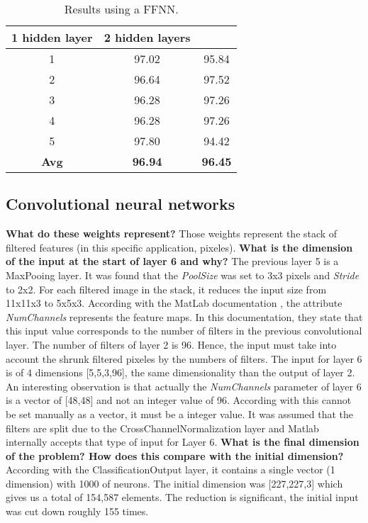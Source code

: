 \begin{table}[!htbp]
\centering
\caption{Results using a FFNN.}
\label{table_sec_4_3}
\medbreak
\begin{tabular}{c|c|c}
1 hidden layer & 2 hidden layers \\\hline
1 & 97.02 & 95.84 \\\hline
2 & 96.64 & 97.52 \\\hline
3 & 96.28 & 97.26  \\\hline
4 & 96.28 & 97.26 \\\hline
5 & 97.80 & 94.42 \\\hline
\textbf{Avg} & \textbf{96.94} & \textbf{96.45}
\end{tabular}
\end{table}


\subsection{Convolutional neural networks}
\textbf{What do these weights represent?}
\smallbreak
Those weights represent the stack of filtered features (in this specific application, pixeles). 
\bigbreak
\textbf{What is the dimension of the input at the start of layer 6 and why?}
\smallbreak
The previous layer 5 is a MaxPooing layer. It was found that the \textit{PoolSize} was set to 3x3 pixels and \textit{Stride} to 2x2. For each filtered image in the stack, it reduces the input size from 11x11x3 to 5x5x3. According with the MatLab documentation \cite{matlab_1}, the attribute \textit{NumChannels} represents the feature maps. In this documentation, they state that this input value corresponds to the number of filters in the previous convolutional layer. The number of filters of layer 2 is 96. Hence, the input must take into account the shrunk filtered pixeles by the numbers of filters. The input for layer 6 is of 4 dimensions [5,5,3,96], the same dimensionality than the output of layer 2. An interesting observation is that actually the \textit{NumChannels}  parameter of layer 6 is a vector of [48,48] and not an integer value of 96. According with \cite{matlab_1} this cannot be set manually as a vector, it must be a integer value. It was assumed that the filters are split due to the CrossChannelNormalization layer and Matlab internally accepts that type of input for Layer 6.
\bigbreak
\textbf{What is the final dimension of the problem? How does this compare with the initial dimension?}
\smallbreak
According with the ClassificationOutput layer, it contains a single vector (1 dimension) with 1000 of neurons. The initial dimension was [227,227,3] which gives us a total of 154,587 elements. The reduction is significant, the initial input was cut down roughly 155 times.



